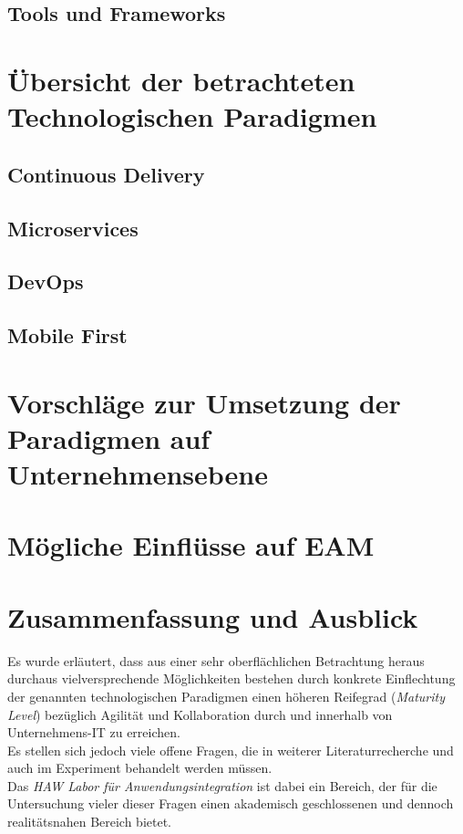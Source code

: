 \documentclass{llncs}
\begin{document}
\subsection{Tools und Frameworks}

%
\section{Übersicht der betrachteten Technologischen Paradigmen}

%
\subsection{Continuous Delivery}

%
\subsection{Microservices}
\subsection{DevOps}
\subsection{Mobile First}
\section{Vorschläge zur Umsetzung der Paradigmen auf Unternehmensebene}
\section{Mögliche Einflüsse auf EAM}
\section{Zusammenfassung und Ausblick}
Es wurde erläutert, dass aus einer sehr oberflächlichen Betrachtung heraus durchaus vielversprechende Möglichkeiten bestehen durch konkrete Einflechtung der genannten technologischen Paradigmen einen höheren Reifegrad (\textit{Maturity Level}) bezüglich Agilität und Kollaboration durch und innerhalb von Unternehmens-IT zu erreichen.\\

Es stellen sich jedoch viele offene Fragen, die in weiterer Literaturrecherche und auch im Experiment behandelt werden müssen.\\

Das \textit{HAW Labor für Anwendungsintegration} ist dabei ein Bereich, der für die Untersuchung vieler dieser Fragen einen akademisch geschlossenen und dennoch realitätsnahen Bereich bietet.\\
\end{document}
